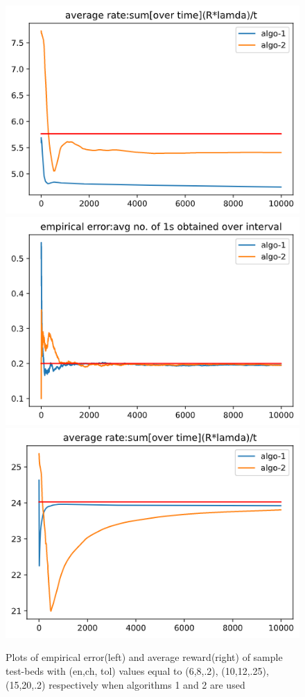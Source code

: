 \documentclass[BTech,thesis]{iitmdiss}
\begin{document}
\begin{figure}[H]
\begin{center}
     \includegraphics[scale=0.4]{1012-comb-rate.png}
     \includegraphics[scale=0.4]{1520-comb-err.png}
     \includegraphics[scale=0.4]{1520-comb-rate.png}
     \caption {Plots of empirical error(left) and average reward(right) of sample test-beds with (en,ch, tol) values equal to (6,8,.2), (10,12,.25), (15,20,.2) respectively when algorithms 1 and 2 are used}
   \label{fig:comb}
   \end{center}
\end{figure} 
\end{document}
